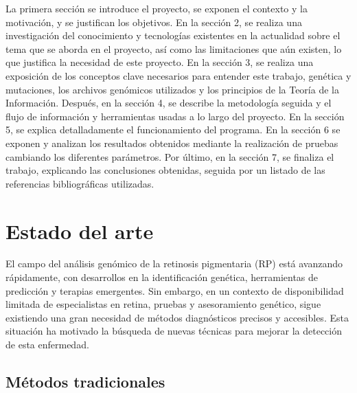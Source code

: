 \documentclass[11pt,spanish,listoffigures,listoftables]{tfgetsinf}
\begin{document}
La primera sección se introduce el proyecto, se exponen el contexto y la motivación, y se justifican los objetivos. En la sección 2, se realiza una investigación del conocimiento y tecnologías existentes en la actualidad sobre el tema que se aborda en el proyecto, así como las limitaciones que aún existen, lo que justifica la necesidad de este proyecto. En la sección 3, se realiza una exposición de los conceptos clave necesarios para entender este trabajo, genética y mutaciones, los archivos genómicos utilizados y los principios de la Teoría de la Información. Después, en la sección 4, se describe la metodología seguida y el flujo de información y herramientas usadas a lo largo del proyecto. En la sección 5, se explica detalladamente el funcionamiento del programa. En la sección 6 se exponen y analizan los resultados obtenidos mediante la realización de pruebas cambiando los diferentes parámetros. Por último, en la sección 7, se finaliza el trabajo, explicando las conclusiones obtenidas, seguida por un listado de las referencias bibliográficas utilizadas. 





\chapter{Estado del arte}

El campo del análisis genómico de la retinosis pigmentaria (\acs{RP}) está avanzando rápidamente, con desarrollos en la identificación genética, herramientas de predicción y terapias emergentes. Sin embargo, en un contexto de disponibilidad limitada de especialistas en retina, pruebas y asesoramiento genético, sigue existiendo una gran necesidad de métodos diagnósticos precisos y accesibles. Esta situación ha motivado la búsqueda de nuevas técnicas para mejorar la detección de esta enfermedad.

\section{Métodos tradicionales}
\end{document}
